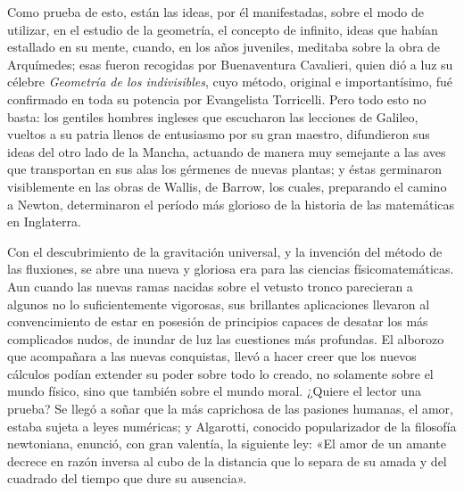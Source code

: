 \documentclass[a4paper, 12pt, draft]{article}
\begin{document}
{Como prueba de esto, están las ideas, por él manifestadas, sobre el modo de utilizar, en el estudio de la geometría, el concepto de infinito, ideas que habían estallado en su mente, cuando, en los años juveniles, meditaba sobre la obra de Arquímedes; esas fueron recogidas por Buenaventura Cavalieri, quien dió a luz su célebre \textit{ Geometría de los indivisibles}, cuyo método, original e importantísimo, fué confirmado en toda su potencia por Evangelista Torricelli. Pero todo esto no basta: los gentiles hombres ingleses que escucharon las lecciones de Galileo, vueltos a su patria llenos de entusiasmo por su gran maestro, difundieron sus ideas del otro lado de la Mancha, actuando de manera muy semejante a las aves que transportan en sus alas los gérmenes de nuevas plantas; y éstas germinaron visiblemente en las obras de Wallis, de Barrow, los cuales, preparando el camino a Newton, determinaron el período más glorioso de la historia de las matemáticas en Inglaterra.


Con el descubrimiento de la gravitación universal, y la invención del método de las fluxiones, se abre una nueva y gloriosa era para las ciencias físicomatemáticas. Aun cuando las nuevas ramas nacidas sobre el vetusto tronco parecieran a algunos no lo suficientemente vigorosas, sus brillantes aplicaciones llevaron al convencimiento de estar en posesión de principios capaces de desatar los más complicados nudos, de inundar de luz las cuestiones más profundas. El alborozo que acompañara a las nuevas conquistas, llevó a hacer creer que los nuevos cálculos podían extender su poder sobre todo lo creado, no solamente sobre el mundo físico, sino que también sobre el mundo moral. ¿Quiere el lector una prueba? Se llegó a soñar que la más caprichosa de las pasiones humanas, el amor, estaba sujeta a leyes numéricas; y Algarotti, conocido popularizador de la filosofía newtoniana, enunció, con gran valentía, la siguiente ley: «El amor de un amante decrece en razón inversa al cubo de la distancia que lo separa de su amada y del cuadrado del tiempo que dure su
ausencia».



}
\end{document}
